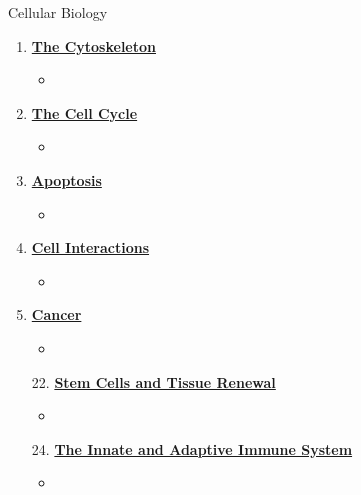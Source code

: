 \documentclass[12pt,letterpaper]{article}
\begin{document}
\begin{contbox}{Cellular Biology}
{\begin{enumerate}[font=\bfseries, wide]
\begin{itemize}
        \item 
    \end{itemize}
    \item \hyperlink{16}{\textbf{The Cytoskeleton}}
    \begin{itemize}
        \item 
    \end{itemize}
    \item \hyperlink{17}{\textbf{The Cell Cycle}}
    \begin{itemize}
        \item 
    \end{itemize}
    \item \hyperlink{18}{\textbf{Apoptosis}}
    \begin{itemize}
        \item 
    \end{itemize}
    \item \hyperlink{19}{\textbf{Cell Interactions}}
    \begin{itemize}
        \item 
    \end{itemize}
    \item \hyperlink{20}{\textbf{Cancer}}
    \begin{itemize}
        \item 
    \end{itemize}    
    \item[22.] \hyperlink{22}{\textbf{Stem Cells and Tissue Renewal}}
    \begin{itemize}
        \item 
    \end{itemize}
    \item[24.] \hyperlink{24}{\textbf{The Innate and Adaptive Immune System}}
    \begin{itemize}
        \item 
    \end{itemize}
\end{enumerate}
}\end{contbox}

\end{document}

